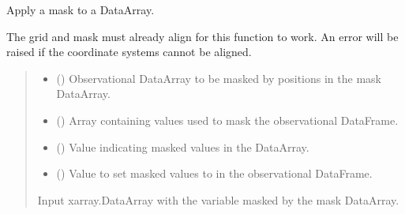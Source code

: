 \documentclass[letterpaper,10pt,english]{sphinxmanual}
\begin{document}
\begin{fulllineitems}
\label{\detokenize{misc:glomar_gridding.mask.mask_array}}
\pysigstartsignatures
\pysiglinewithargsret
{}
{\sphinxparamcomma {}\sphinxparamcomma {}\sphinxparamcomma {}}
{}
\pysigstopsignatures
\sphinxAtStartPar
Apply a mask to a DataArray.

\sphinxAtStartPar
The grid and mask must already align for this function to work. An error
will be raised if the coordinate systems cannot be aligned.
\begin{quote}\begin{description}
\begin{itemize}
\item {}
\sphinxAtStartPar
{} () \textendash{} Observational DataArray to be masked by positions in the mask
DataArray.

\item {}
\sphinxAtStartPar
{} () \textendash{} Array containing values used to mask the observational DataFrame.

\item {}
\sphinxAtStartPar
{} () \textendash{} Value indicating masked values in the DataArray.

\item {}
\sphinxAtStartPar
{} () \textendash{} Value to set masked values to in the observational DataFrame.

\end{itemize}

\sphinxAtStartPar
{} \textendash{} Input xarray.DataArray with the variable masked by the mask DataArray.

\sphinxAtStartPar
{}

\end{description}\end{quote}

\end{fulllineitems}
\end{document}
